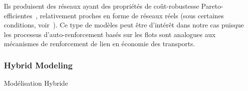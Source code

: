 {Ils produisent des réseaux ayant des propriétés de coût-robustesse Pareto-efficientes~\cite{tero2010rules}, 
relativement proches en forme de réseaux réels (sous certaines conditions, voir~\cite{adamatzky2010road}). Ce type de modèles peut être d'intérêt dans notre cas puisque les processus d'auto-renforcement basés sur les flots sont analogues aux mécanismes de renforcement de lien en économie des transports.
}





\subsubsection{Hybrid Modeling}{Modélisation Hybride}







